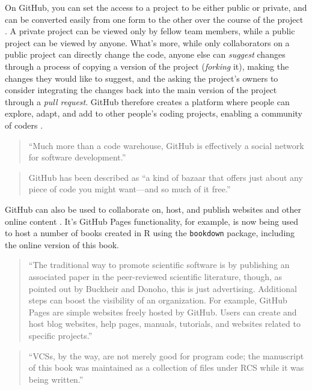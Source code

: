 \documentclass[]{tufte-book}
\begin{document}
On GitHub, you can set the access to a project to be either public or private,
and can be converted easily from one form to the other over the course of the
project \citep{metz2015github}. A private project can be viewed only by fellow team
members, while a public project can be viewed by anyone. What's more, while only
collaborators on a public project can directly change the code, anyone else can
\emph{suggest} changes through a process of copying a version of the project
(\emph{forking} it), making the changes they would like to suggest, and the asking
the project's owners to consider integrating the changes back into the main
version of the project through a \emph{pull request}. GitHub therefore creates a
platform where people can explore, adapt, and add to other people's coding
projects, enabling a community of coders \citep{perez2016ten}.

\begin{quote}
``Much more than a code warehouse, GitHub is effectively a social network for
software development.'' \citep{perkel2018git}
\end{quote}

\begin{quote}
GitHub has been described as ``a kind of bazaar that offers just about any
piece of code you might want---and so much of it free.'' \citep{metz2015github}
\end{quote}

GitHub can also be used to collaborate on, host, and publish websites and other
online content \citep{perez2016ten}. It's GitHub Pages functionality, for example, is
now being used to host a number of books created in R using the \texttt{bookdown}
package, including the online version of this book.

\begin{quote}
``The traditional way to promote scientific software is by publishing an associated
paper in the peer-reviewed scientific literature, though, as pointed out by Buckheir and
Donoho, this is just advertising. Additional steps can boost the visibility of
an organization. For example, GitHub Pages are simple websites freely hosted by
GitHub. Users can create and host blog websites, help pages, manuals, tutorials,
and websites related to specific projects.'' \citep{perez2016ten}
\end{quote}

\begin{quote}
``VCSs, by the way, are not merely good for program code; the manuscript of this
book was maintained as a collection of files under RCS while it was being written.''
\citep{raymond2003art}
\end{quote}
\end{document}
